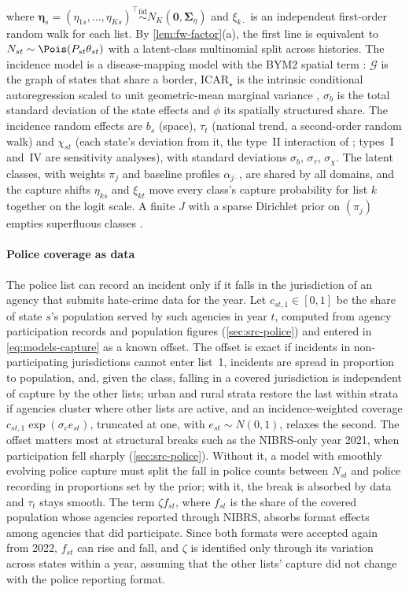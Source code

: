 where $\bm\eta_s=(\eta_{1s},\dots,\eta_{Ks})^{\top}\overset{\text{iid}}{\sim}N_K(\bm0,\bm\Sigma_\eta)$ and $\xi_{k\cdot}$ is an independent first-order random walk for each list. By \cref{lem:fw-factor}(a), the first line is equivalent to $N_{st}\sim\Pois(P_{st}\theta_{st})$ with a latent-class multinomial split across histories. The incidence model is a disease-mapping model with the BYM2 spatial term \citep{riebler2016,besag1991}: $\mathcal G$ is the graph of states that share a border, $\mathrm{ICAR}_\star$ is the intrinsic conditional autoregression scaled to unit geometric-mean marginal variance \citep{sorbye2014}, $\sigma_b$ is the total standard deviation of the state effects and $\phi$ its spatially structured share. The incidence random effects are $b_s$ (space), $\tau_t$ (national trend, a second-order random walk) and $\chi_{st}$ (each state's deviation from it, the type~II interaction of \citet{knorrheld2000}; types~I and~IV are sensitivity analyses), with standard deviations $\sigma_b$, $\sigma_\tau$, $\sigma_\chi$. The latent classes, with weights $\pi_j$ and baseline profiles $\alpha_{j\cdot}$, are shared by all domains, and the capture shifts $\eta_{ks}$ and $\xi_{kt}$ move every class's capture probability for list $k$ together on the logit scale. A finite $J$ with a sparse Dirichlet prior on $(\pi_j)$ empties superfluous classes \citep{rousseau2011}.

\paragraph{Police coverage as data} The police list can record an incident only if it falls in the jurisdiction of an agency that submits hate-crime data for the year. Let $c_{st,1}\in[0,1]$ be the share of state $s$'s population served by such agencies in year $t$, computed from agency participation records and population figures (\cref{sec:src-police}) and entered in \eqref{eq:models-capture} as a known offset. The offset is exact if incidents in non-participating jurisdictions cannot enter list~1, incidents are spread in proportion to population, and, given the class, falling in a covered jurisdiction is independent of capture by the other lists; urban and rural strata restore the last within strata if agencies cluster where other lists are active, and an incidence-weighted coverage $c_{st,1}\exp(\sigma_ce_{st})$, truncated at one, with $e_{st}\sim N(0,1)$, relaxes the second. The offset matters most at structural breaks such as the NIBRS-only year 2021, when participation fell sharply (\cref{sec:src-police}). Without it, a model with smoothly evolving police capture must split the fall in police counts between $N_{st}$ and police recording in proportions set by the prior; with it, the break is absorbed by data and $\tau_t$ stays smooth. The term $\zeta f_{st}$, where $f_{st}$ is the share of the covered population whose agencies reported through NIBRS, absorbs format effects among agencies that did participate. Since both formats were accepted again from 2022, $f_{st}$ can rise and fall, and $\zeta$ is identified only through its variation across states within a year, assuming that the other lists' capture did not change with the police reporting format.


